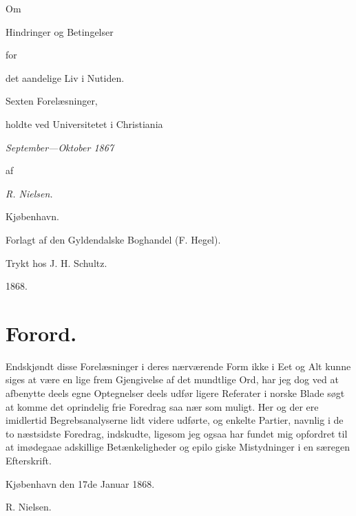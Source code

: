 \documentclass[12pt]{book}
\begin{document}
\frontmatter
\begin{titlepage}
\centering
Om\par
{\Large Hindringer og Betingelser}\par
for\par
{\LARGE det aandelige Liv i Nutiden.}\par
\bigskip
{\large Sexten Forelæsninger,}\par
holdte ved Universitetet i Christiania\par
\emph{September---Oktober 1867}\par
\medskip
af\par
\emph{R. Nielsen.}\par
\vfill
\vfill
Kjøbenhavn.\par
Forlagt af den Gyldendalske Boghandel (F. Hegel).\par
{\small Trykt hos J. H. Schultz.}\par
1868.\par
\end{titlepage}

\chapter*{Forord.}

Endskjøndt disse Forelæsninger i deres nærværende
Form ikke i Eet og Alt kunne siges at være en lige\-%
frem Gjengivelse af det mundtlige Ord, har jeg dog
ved at afbenytte deels egne Optegnelser deels udfør\-%
ligere Referater i norske Blade søgt at komme det
oprindelig frie Foredrag saa nær som muligt. Her og
der ere imidlertid Begrebsanalyserne lidt videre udførte,
og enkelte Partier, navnlig i de to næstsidste Foredrag,
indskudte, ligesom jeg ogsaa har fundet mig opfordret
til at imødegaae adskillige Betænkeligheder og epilo\-%
giske Mistydninger i en særegen Efterskrift.

\medskip
\noindent\hspace*{2em}Kjøbenhavn den 17de Januar 1868.

\begin{flushright}
R. Nielsen.
\end{flushright}
\end{document}
